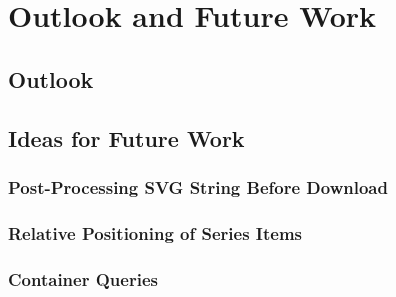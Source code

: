 \chapter{Outlook and Future Work}

\label{chap:Outlook}


\section{Outlook}

\section{Ideas for Future Work}

\subsection{Post-Processing SVG String Before Download}


\subsection{Relative Positioning of Series Items}


\subsection{Container Queries}